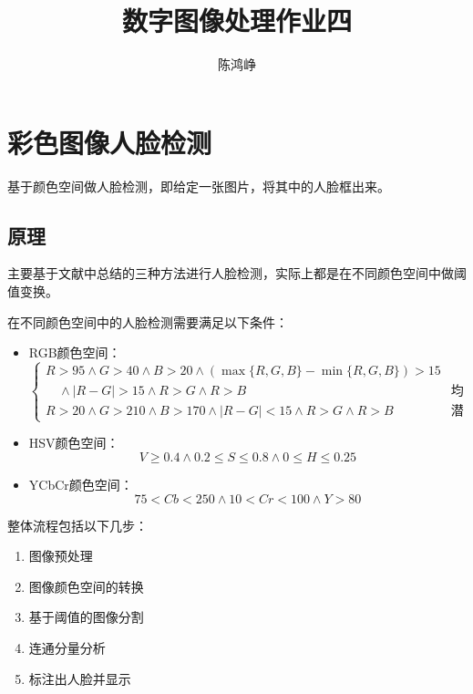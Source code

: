 \documentclass[logo,reportComp]{thesis}
\title{数字图像处理作业四}
\subtitle{}
\author{陈鸿峥}
\begin{document}
\maketitle

\section{彩色图像人脸检测}
基于颜色空间做人脸检测，即给定一张图片，将其中的人脸框出来。

\subsection{原理}
主要基于文献\cite{bib:face_recog}中总结的三种方法进行人脸检测，实际上都是在不同颜色空间中做阈值变换。

在不同颜色空间中的人脸检测需要满足以下条件：
\begin{itemize}
	\item RGB颜色空间：
	\[\begin{cases}
	R>95\land G>40\land B>20\land (\max\{R,G,B\}-\min\{R,G,B\})>15\\
	\quad\land |R-G|>15 \land R>G \land R>B & \text{均匀照明}\\
	R>20\land G>210\land B>170\land |R-G|<15 \land R>G \land R>B & \text{潜在照明}
	\end{cases}\]
	\item HSV颜色空间：
	\[V\geq 0.4\land 0.2\leq S\leq 0.8\land 0\leq H\leq 0.25\]
	\item YCbCr颜色空间：
	\[75<Cb<250\land 10<Cr<100\land Y>80\]
\end{itemize}

整体流程包括以下几步：
\begin{enumerate}
	\item 图像预处理
	\item 图像颜色空间的转换
	\item 基于阈值的图像分割
	\item 连通分量分析
	\item 标注出人脸并显示
\end{enumerate}
\end{document}

